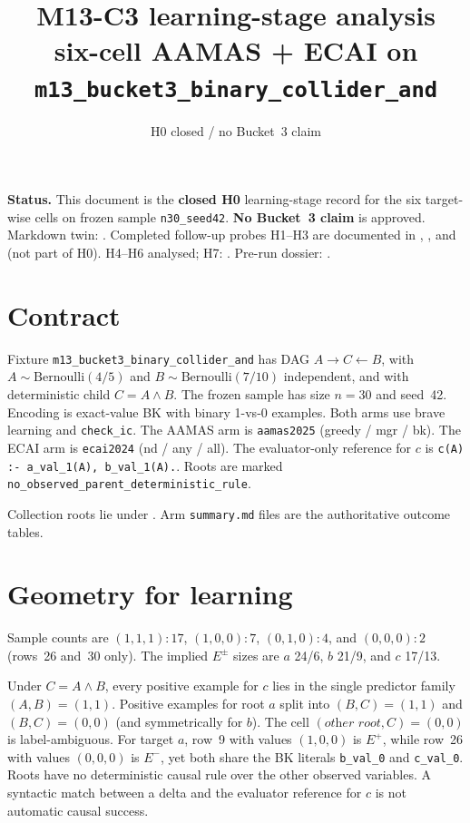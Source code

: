 \documentclass[11pt]{article}
\title{M13-C3 learning-stage analysis\\
six-cell AAMAS + ECAI on \texttt{m13\_bucket3\_binary\_collider\_and}}
\author{}
\date{H0 closed / no Bucket~3 claim}
\begin{document}
\maketitle

\noindent\textbf{Status.}
This document is the \textbf{closed H0} learning-stage record for the six
target-wise cells on frozen sample \texttt{n30\_seed42}.
\textbf{No Bucket~3 claim} is approved.
Markdown twin: .
Completed follow-up probes H1--H3 are documented in
,
, and
 (not part of H0).
H4--H6 analysed; H7: .
Pre-run dossier: .

\section{Contract}

Fixture \texttt{m13\_bucket3\_binary\_collider\_and} has DAG
\(A\to C\leftarrow B\), with
\(A\sim\mathrm{Bernoulli}(4/5)\) and \(B\sim\mathrm{Bernoulli}(7/10)\)
independent, and with deterministic child \(C=A\land B\).
The frozen sample has size \(n{=}30\) and seed~42.
Encoding is exact-value BK with binary 1-vs-0 examples.
Both arms use brave learning and \texttt{check\_ic}.
The AAMAS arm is \texttt{aamas2025} (greedy / mgr / bk).
The ECAI arm is \texttt{ecai2024} (nd / any / all).
The evaluator-only reference for \(c\) is
\texttt{c(A) :- a\_val\_1(A), b\_val\_1(A).}.
Roots are marked \texttt{no\_observed\_parent\_deterministic\_rule}.

Collection roots lie under
.
Arm \texttt{summary.md} files are the authoritative outcome tables.

\section{Geometry for learning}

Sample counts are \((1,1,1):17\), \((1,0,0):7\), \((0,1,0):4\), and
\((0,0,0):2\) (rows~26 and~30 only).
The implied \(E^\pm\) sizes are \(a\) 24/6, \(b\) 21/9, and \(c\) 17/13.

Under \(C=A\land B\), every positive example for \(c\) lies in the single
predictor family \((A,B)=(1,1)\).
Positive examples for root \(a\) split into \((B,C)=(1,1)\) and \((B,C)=(0,0)\)
(and symmetrically for \(b\)).
The cell \((\textit{other root},C)=(0,0)\) is label-ambiguous.
For target \(a\), row~9 with values \((1,0,0)\) is \(E^+\), while row~26 with
values \((0,0,0)\) is \(E^-\), yet both share the BK literals
\texttt{b\_val\_0} and \texttt{c\_val\_0}.
Roots have no deterministic causal rule over the other observed variables.
A syntactic match between a delta and the evaluator reference for \(c\) is not
automatic causal success.
\end{document}
